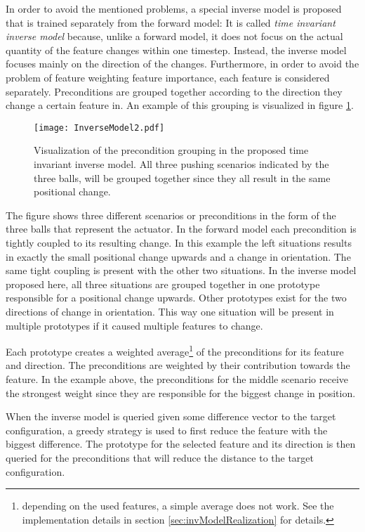 In order to avoid the mentioned problems, a special inverse model is proposed that is trained separately from the forward model:
It is called \textit{time invariant inverse model} because, unlike a forward model, it does not focus on the actual quantity of the feature changes within one timestep. Instead, the inverse model focuses mainly on the direction of the changes. Furthermore, in order to avoid the problem of feature weighting feature importance, each feature is considered separately. 
Preconditions are grouped together according to the direction they change a certain feature in. An example of this grouping is visualized in figure \ref{fig:InverseModel}. 

\begin{figure}
	\centering
	\texttt{[image: InverseModel2.pdf]}
	\caption{Visualization of the precondition grouping in the proposed time invariant inverse model. All three pushing scenarios indicated by the three balls, will be grouped together since they all result in the same positional change.}
	\label{fig:InverseModel}
\end{figure}

The figure shows three different scenarios or preconditions in the form of the three balls that represent the actuator. In the forward model each precondition is tightly coupled to its resulting change. In this example the left situations results in exactly the small positional change upwards and a change in orientation. The same tight coupling is present with the other two situations. In the inverse model proposed here, all three situations are grouped together in one prototype responsible for a positional change upwards. Other prototypes exist for the two directions of change in orientation. This way one situation will be present in multiple prototypes if it caused multiple features to change.

Each prototype creates a weighted average\footnote{depending on the used features, a simple average does not work. See the implementation details in section \ref{sec:invModelRealization} for details.} of the preconditions for its feature and direction. The preconditions are weighted by their contribution towards the feature. In the example above, the preconditions for the middle scenario receive the strongest weight since they are responsible for the biggest change in position. 

When the inverse model is queried given some difference vector to the target configuration, a greedy strategy is used to first reduce the feature with the biggest difference. The prototype for the selected feature and its direction is then queried for the preconditions that will reduce the distance to the target configuration. 



	
